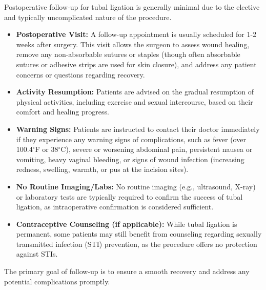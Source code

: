 Postoperative follow-up for tubal ligation is generally minimal due to the elective and typically uncomplicated nature of the procedure.

\begin{itemize}
  \item \textbf{Postoperative Visit:} A follow-up appointment is usually scheduled for 1-2 weeks after surgery. This visit allows the surgeon to assess wound healing, remove any non-absorbable sutures or staples (though often absorbable sutures or adhesive strips are used for skin closure), and address any patient concerns or questions regarding recovery.

  \item \textbf{Activity Resumption:} Patients are advised on the gradual resumption of physical activities, including exercise and sexual intercourse, based on their comfort and healing progress.

  \item \textbf{Warning Signs:} Patients are instructed to contact their doctor immediately if they experience any warning signs of complications, such as fever (over 100.4$^{\circ}$F or 38$^{\circ}$C), severe or worsening abdominal pain, persistent nausea or vomiting, heavy vaginal bleeding, or signs of wound infection (increasing redness, swelling, warmth, or pus at the incision sites).

  \item \textbf{No Routine Imaging/Labs:} No routine imaging (e.g., ultrasound, X-ray) or laboratory tests are typically required to confirm the success of tubal ligation, as intraoperative confirmation is considered sufficient.

  \item \textbf{Contraceptive Counseling (if applicable):} While tubal ligation is permanent, some patients may still benefit from counseling regarding sexually transmitted infection (STI) prevention, as the procedure offers no protection against STIs.
\end{itemize}

The primary goal of follow-up is to ensure a smooth recovery and address any potential complications promptly.

